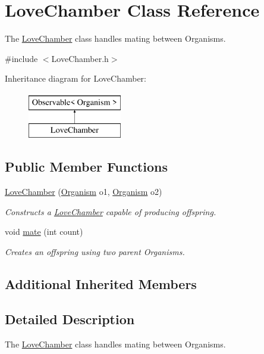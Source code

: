 \hypertarget{class_love_chamber}{}\section{Love\+Chamber Class Reference}
\label{class_love_chamber}


The \hyperlink{class_love_chamber}{Love\+Chamber} class handles mating between Organisms.  




{\ttfamily \#include $<$Love\+Chamber.\+h$>$}

Inheritance diagram for Love\+Chamber\+:\begin{figure}[H]
\begin{center}
\leavevmode
\includegraphics[height=2.000000cm]{class_love_chamber}
\end{center}
\end{figure}
\subsection*{Public Member Functions}
\begin{DoxyCompactItemize}
\item 
\hyperlink{class_love_chamber_afd8934456036b6252e0e968c26ffb04e}{Love\+Chamber} (\hyperlink{class_organism}{Organism} o1, \hyperlink{class_organism}{Organism} o2)
\begin{DoxyCompactList}\small\item\em Constructs a \hyperlink{class_love_chamber}{Love\+Chamber} capable of producing offspring. \end{DoxyCompactList}\item 
void \hyperlink{class_love_chamber_a9dafc3e7dff1ee60359ca9b78db6e13a}{mate} (int count)
\begin{DoxyCompactList}\small\item\em Creates an offspring using two parent Organisms. \end{DoxyCompactList}\end{DoxyCompactItemize}
\subsection*{Additional Inherited Members}


\subsection{Detailed Description}
The \hyperlink{class_love_chamber}{Love\+Chamber} class handles mating between Organisms. 

